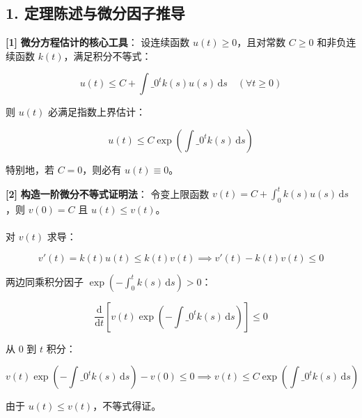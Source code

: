 \documentclass[11pt,a4paper,UTF8]{ctexart}
\begin{document}
\subsection{1. 定理陈述与微分因子推导}
\begin{solbox}[分步推导与答题规范]
\textbf{[1]}  \textbf{微分方程估计的核心工具}：
设连续函数 $u(t) \ge 0$，且对常数 $C \ge 0$ 和非负连续函数 $k(t)$，满足积分不等式：

\begin{equation*}
u(t) \le C + \int\_0^t k(s)u(s)\,\mathrm{d}s \quad (\forall t \ge 0)
\end{equation*}

则 $u(t)$ 必满足指数上界估计：

\begin{equation*}
u(t) \le C \exp\left( \int\_0^t k(s)\,\mathrm{d}s \right)
\end{equation*}

特别地，若 $C = 0$，则必有 $u(t) \equiv 0$。

\textbf{[2]}  \textbf{构造一阶微分不等式证明法}：
令变上限函数 $v(t) = C + \int_0^t k(s)u(s)\,\mathrm{d}s$，则 $v(0) = C$ 且 $u(t) \le v(t)$。\\ \\
对 $v(t)$ 求导：

\begin{equation*}
v'(t) = k(t)u(t) \le k(t)v(t) \implies v'(t) - k(t)v(t) \le 0
\end{equation*}

两边同乘积分因子 $\exp\left(-\int_0^t k(s)\,\mathrm{d}s\right) > 0$：

\begin{equation*}
\frac{\mathrm{d}}{\mathrm{d}t}\left[ v(t)\exp\left(-\int\_0^t k(s)\,\mathrm{d}s\right) \right] \le 0
\end{equation*}

从 $0$ 到 $t$ 积分：

\begin{equation*}
v(t)\exp\left(-\int\_0^t k(s)\,\mathrm{d}s\right) - v(0) \le 0 \implies v(t) \le C \exp\left(\int\_0^t k(s)\,\mathrm{d}s\right)
\end{equation*}

由于 $u(t) \le v(t)$，不等式得证。
\end{solbox}
\end{document}

